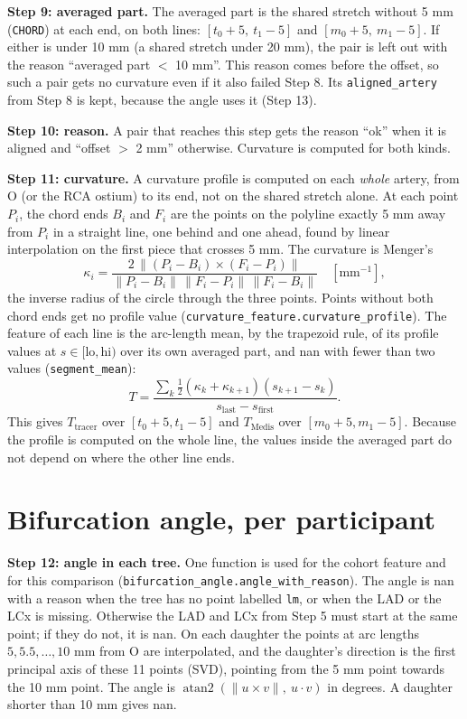 \documentclass[11pt,a4paper]{article}
\newcommand{\code}[1]{\texttt{#1}}
\begin{document}
\textbf{Step 9: averaged part.} The averaged part is the shared stretch without 5 mm (\code{CHORD}) at
each end, on both lines: $[t_0+5,\ t_1-5]$ and $[m_0+5,\ m_1-5]$. If either is under 10 mm (a shared
stretch under 20 mm), the pair is left out with the reason ``averaged part $<$ 10 mm''. This reason comes
before the offset, so such a pair gets no curvature even if it also failed Step 8. Its
\code{aligned\_artery} from Step 8 is kept, because the angle uses it (Step 13).

\textbf{Step 10: reason.} A pair that reaches this step gets the reason ``ok'' when it is aligned and
``offset $>$ 2 mm'' otherwise. Curvature is computed for both kinds.

\textbf{Step 11: curvature.} A curvature profile is computed on each \emph{whole} artery, from O (or the
RCA ostium) to its end, not on the shared stretch alone. At each point $P_i$, the chord ends $B_i$ and
$F_i$ are the points on the polyline exactly 5 mm away from $P_i$ in a straight line, one behind and one
ahead, found by linear interpolation on the first piece that crosses 5 mm. The curvature is Menger's
\[
\kappa_i=\frac{2\,\lVert (P_i-B_i)\times(F_i-P_i)\rVert}{\lVert P_i-B_i\rVert\,\lVert F_i-P_i\rVert\,\lVert F_i-B_i\rVert}
\quad[\text{mm}^{-1}],
\]
the inverse radius of the circle through the three points. Points without both chord ends get no
profile value (\code{curvature\_feature.curvature\_profile}). The feature of each line is the arc-length
mean, by the trapezoid rule, of its profile values at $s\in[\text{lo},\text{hi})$ over its own averaged
part, and nan with fewer than two values (\code{segment\_mean}):
\[
T=\frac{\sum_k \tfrac12(\kappa_k+\kappa_{k+1})(s_{k+1}-s_k)}{s_{\text{last}}-s_{\text{first}}}.
\]
This gives $T_{\text{tracer}}$ over $[t_0+5,t_1-5]$ and $T_{\text{Medis}}$ over $[m_0+5,m_1-5]$. Because
the profile is computed on the whole line, the values inside the averaged part do not depend on where the
other line ends.

\section{Bifurcation angle, per participant}

\textbf{Step 12: angle in each tree.} One function is used for the cohort feature and for this comparison
(\code{bifurcation\_angle.angle\_with\_reason}). The angle is nan with a reason when the tree has no point
labelled \code{lm}, or when the LAD or the LCx is missing. Otherwise the LAD and LCx from Step 5 must start
at the same point; if they do not, it is nan. On each daughter the points at arc lengths
$5, 5.5,\dots,10$ mm from O are interpolated, and the daughter's direction is the first principal axis of
these 11 points (SVD), pointing from the 5 mm point towards the 10 mm point. The angle is
$\operatorname{atan2}(\lVert u\times v\rVert,\ u\cdot v)$ in degrees. A daughter shorter than 10 mm gives
nan.
\end{document}
